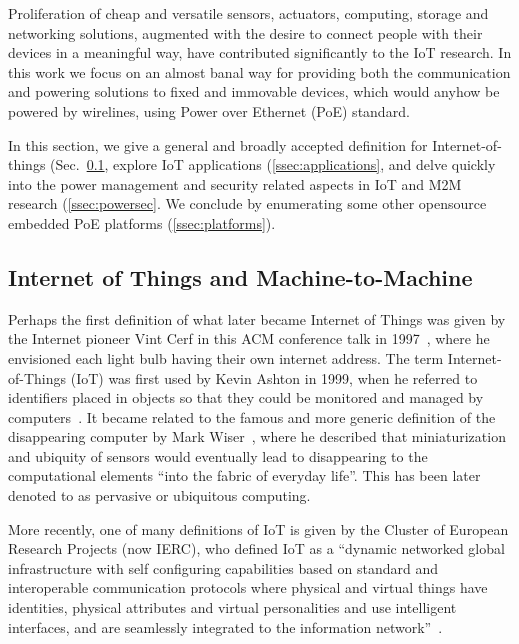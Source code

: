 \documentclass{siamltex}
\begin{document}
Proliferation of cheap and versatile sensors, actuators, computing, storage and
networking solutions, augmented with the desire to connect people with their
devices in a meaningful way, have contributed significantly to the IoT
research. 
In this work we focus on an
almost banal way for providing both the communication and powering solutions to
fixed and immovable devices, which would anyhow be powered by wirelines, using
Power over Ethernet (PoE) standard. 

In this section, we give a general and broadly accepted definition for
Internet-of-things (Sec.~\ref{ssec:definition}, explore IoT
applications (\ref{ssec:applications}, and delve quickly into the
power management and security related aspects in IoT and M2M research
(\ref{ssec:powersec}.  We conclude by enumerating some
other opensource embedded PoE platforms (\ref{ssec:platforms}).


\subsection{Internet of Things and Machine-to-Machine}
\label{ssec:definition}

Perhaps the first definition of what later became Internet of Things
was given by the Internet pioneer Vint Cerf in this ACM conference
talk in 1997~\cite{cerf1997next}, where he envisioned each light bulb
having their own internet address.  
The term Internet-of-Things (IoT) was first used
by Kevin Ashton in 1999, when he referred to identifiers
placed in objects so that they could be monitored and managed by
computers~\cite{ashton2009internet}.  It
became related to the famous and more generic definition of the
disappearing computer by Mark Wiser~\cite{weiser1991computer}, where he
described that miniaturization and ubiquity of sensors would
eventually lead to disappearing to the computational elements ``into
the fabric of everyday life''.  This has been later denoted to as
pervasive or ubiquitous computing.

More recently, one of many definitions of IoT is given by the Cluster
of European Research
Projects (now IERC), who defined IoT as a ``dynamic networked global
infrastructure with self configuring capabilities based on standard
and interoperable communication protocols where physical and virtual
things have identities, physical attributes and virtual personalities
and use intelligent interfaces, and are seamlessly integrated to the
information network''~\cite{vermesan2011internet}.
\end{document}
